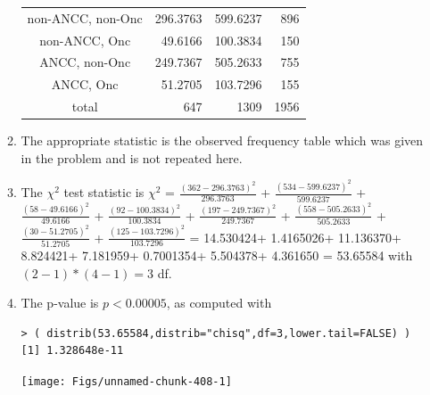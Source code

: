 \documentclass[10pt,openany]{book}\usepackage[]{graphicx}\usepackage[]{color}
\makeatletter
\newenvironment{kframe}{%
 \def\at@end@of@kframe{}%
 \ifinner\ifhmode%
  \def\at@end@of@kframe{\end{minipage}}%
  \begin{minipage}{\columnwidth}%
 \fi\fi%
 \def\FrameCommand##1{\hskip\@totalleftmargin \hskip-\fboxsep
 \colorbox{shadecolor}{##1}\hskip-\fboxsep
     \hskip-\linewidth \hskip-\@totalleftmargin \hskip\columnwidth}%
 \MakeFramed {\advance\hsize-\width
   \@totalleftmargin\z@ \linewidth\hsize
   \@setminipage}}%
 {\par\unskip\endMakeFramed%
 \at@end@of@kframe}
\newenvironment{knitrout}{}{} %
\makeatother
\begin{document}
\begin{itemize}
\begin{enumerate}
\begin{center}
\begin{tabular}{c|rr|r}
            \hline
            non-ANCC, non-Onc & 296.3763 & 599.6237 & 896 \\
            non-ANCC, Onc     &  49.6166 & 100.3834  & 150 \\
            ANCC, non-Onc     & 249.7367 & 505.2633 & 755 \\
            ANCC, Onc         &  51.2705 & 103.7296 & 155 \\
            \hline
            total & 647 & 1309 & 1956 \\
            \hline\hline
          \end{tabular}
        \end{center}
      \item The appropriate statistic is the observed frequency table which was given in the problem and is not repeated here.
      \item The $\chi^{2}$ test statistic is $\chi^{2}$ = $\frac{(362-296.3763)^{2}}{296.3763}$ + $\frac{(534-599.6237)^{2}}{599.6237}$ + $\frac{(58-49.6166)^{2}}{49.6166}$ + $\frac{(92-100.3834)^{2}}{100.3834}$ + $\frac{(197-249.7367)^{2}}{249.7367}$ + $\frac{(558-505.2633)^{2}}{505.2633}$ + $\frac{(30-51.2705)^{2}}{51.2705}$ + $\frac{(125-103.7296)^{2}}{103.7296}$ = 14.530424+ 1.4165026+ 11.136370+ 8.824421+ 7.181959+ 0.7001354+ 5.504378+ 4.361650 = 53.65584 with $(2-1)*(4-1)=3$ df.
      \item The p-value is $p<0.00005$, as computed with
\begin{knitrout}
\color{fgcolor}\begin{kframe}
\begin{verbatim}
> ( distrib(53.65584,distrib="chisq",df=3,lower.tail=FALSE) )
[1] 1.328648e-11
\end{verbatim}
\end{kframe}

{\centering \texttt{[image: Figs/unnamed-chunk-408-1]} 

}




\end{knitrout}
\end{enumerate}
\end{itemize}
\end{document}
